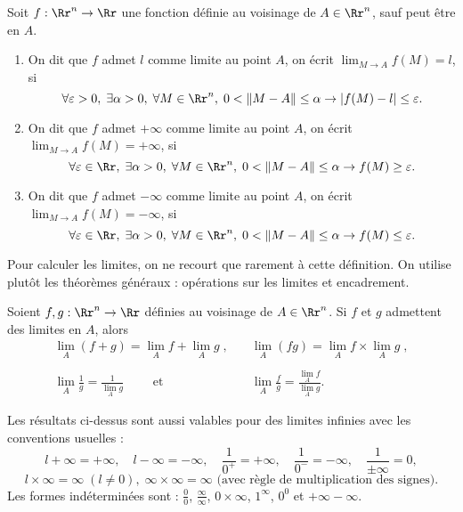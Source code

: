 \documentclass[class=report,crop=false]{standalone}
\begin{document}
\begin{definition}Soit $f:\Rr^n\to \Rr$ une fonction définie au voisinage de $A\in \Rr^n$, sauf peut \^etre en $A$.
\begin{enumerate}
\item On dit que $f$ admet $l$ comme limite au point $A$, on écrit $\displaystyle \lim _{M\to A}f(M)=l$, si
$$\forall \varepsilon >0,\; \exists \alpha >0,\; \forall M\in \Rr^n,\; 0<\|M-A\| \leq \alpha \rightarrow |f(M)-l|\leq \varepsilon .$$
\item On dit que $f$ admet $+\infty$ comme limite au point $A$, on écrit $\displaystyle \lim _{M\to A}f(M)=+\infty$, si
$$\forall \varepsilon \in \Rr,\; \exists \alpha >0,\; \forall M\in \Rr^n,\; 0<\|M-A\| \leq \alpha \rightarrow f(M)\geq \varepsilon .$$
\item On dit que $f$ admet $-\infty$ comme limite au point $A$, on écrit $\displaystyle \lim _{M\to A}f(M)=-\infty$, si
$$\forall \varepsilon \in \Rr,\; \exists \alpha >0,\; \forall M\in \Rr^n,\; 0<\|M-A\| \leq \alpha \rightarrow f(M)\leq \varepsilon .$$
\end{enumerate}
\end{definition}

\vskip4mm

\noindent Pour calculer les limites, on ne recourt que rarement à cette définition. On utilise plut\^ot les théorèmes généraux : opérations sur les limites et encadrement.

\vskip6mm

\begin{theoreme} Soient $f,g:\Rr^n\to \Rr$ définies au voisinage de $A\in \Rr^n$. Si $f$ et $g$ admettent des limites en $A$, alors
$$\begin{array}{ll}\displaystyle \lim _{A}(f+g)=\lim _{A}f+\lim _{A}g\;,&\quad \displaystyle \lim _{A}(fg)=\lim _{A}f\times \lim _{A}g\; ,\\ \\ \displaystyle \lim _{A}\frac{1}{g}=\frac{1}{\lim _{A}g}\qquad \mbox{ et }&\quad \displaystyle \lim _{A}\frac{f}{g}=\frac{\lim _{A}f}{\lim _{A}g}.\end{array}$$
\end{theoreme}

\vskip4mm

Les résultats ci-dessus sont aussi valables pour des limites infinies avec les conventions usuelles :
$$l+\infty =+\infty,\quad l-\infty =-\infty,\quad \frac{1}{0^+}=+\infty ,\quad \frac{1}{0^-}=-\infty ,\quad \frac{1}{\pm \infty }=0,$$
$$l\times \infty =\infty \; (l\neq 0),\; \infty \times \infty =\infty \mbox{ (avec règle de multiplication des signes).}$$
Les formes indéterminées sont : $\displaystyle \frac{0}{0}$, $\displaystyle \frac{\infty }{\infty}$, $\displaystyle 0\times \infty$, $\displaystyle 1^{\infty}$, $0^0$ et $+\infty -\infty $.
\end{document}
